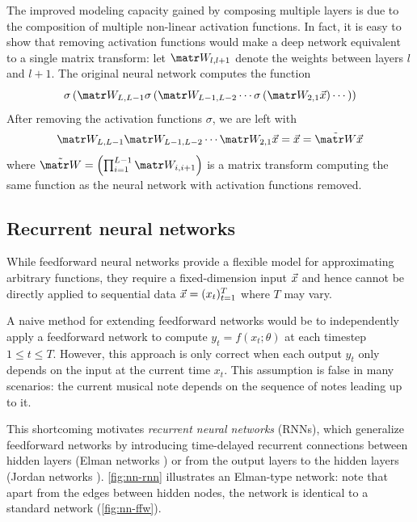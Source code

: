 The improved modeling capacity gained by composing multiple layers is due to
the composition of multiple non-linear activation functions.
In fact, it is easy to show that removing activation functions would make
a deep network equivalent to a single matrix transform: let $\W_{l,l+1}$
denote the weights between layers $l$ and $l+1$. The original neural network
computes the function
\begin{equation}
    \sigma\left(
        \W_{L,L-1} \sigma \left(
            \W_{L-1,L-2}\cdots \sigma \left(
                \W_{2,1} \x
            \right) \cdots
        \right)
    \right)
\end{equation}
After removing the activation functions $\sigma$, we are left with
\begin{equation}
    \W_{L,L-1} \W_{L-1,L-2}\cdots \W_{2,1} \x
    = \x
    = \tilde{\W} \x
\end{equation}
where $\tilde{\W} = \left(\prod_{i=1}^{L-1} \W_{i,i+1} \right)$
is a matrix transform computing the same function as the neural network with
activation functions removed.

\subsection{Recurrent neural networks}

While feedforward neural networks provide a flexible model for approximating
arbitrary functions, they require a fixed-dimension input $\vec{x}$ and hence
cannot be directly applied to sequential data $\vec{x} = (x_t)_{t=1}^T$ where $T$ may
vary.


A naive method for extending feedforward networks would be to independently
apply a feedforward network to compute $y_t = f(x_t; \theta)$ at each timestep
$1 \leq t \leq T$. However, this approach is only correct when each output $y_t$
only depends on the input at the current time $x_t$. This assumption
is false in many scenarios: the current musical note depends on the sequence of
notes leading up to it.

This shortcoming motivates \emph{recurrent neural networks} (RNNs), which
generalize feedforward networks by introducing time-delayed recurrent
connections between hidden layers (Elman networks \cite{elman1990finding}) or
from the output layers to the hidden layers (Jordan networks
\cite{jordan1997serial}). \autoref{fig:nn-rnn} illustrates an Elman-type network:
note that apart from the edges between hidden nodes, the network is identical to
a standard network (\autoref{fig:nn-ffw}).

